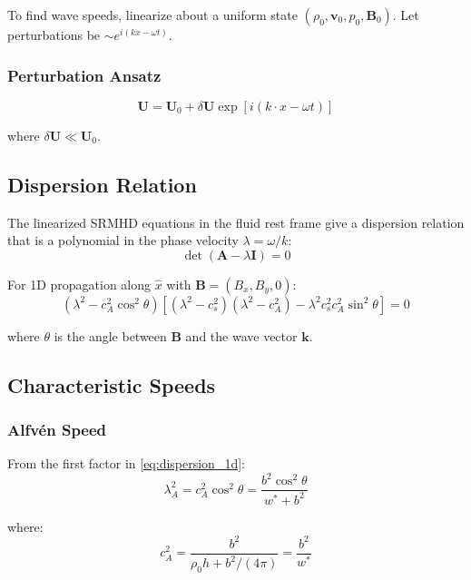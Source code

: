 \documentclass[12pt,a4paper]{article}
\begin{document}
To find wave speeds, linearize about a uniform state $(\rho_0, \bm{v}_0, p_0, \bm{B}_0)$.
Let perturbations be $\sim e^{i(kx - \omega t)}$.

\subsubsection{Perturbation Ansatz}

\begin{equation}
\bm{U} = \bm{U}_0 + \delta\bm{U} \exp[i(k \cdot x - \omega t)]
\label{eq:perturbation}
\end{equation}

where $\delta\bm{U} \ll \bm{U}_0$.

\subsection{Dispersion Relation}

The linearized SRMHD equations in the fluid rest frame give a dispersion relation
that is a polynomial in the phase velocity $\lambda = \omega/k$:
\begin{equation}
\det(\bm{A} - \lambda \bm{I}) = 0
\label{eq:dispersion_general}
\end{equation}

For 1D propagation along $\hat{x}$ with $\bm{B} = (B_x, B_y, 0)$:
\begin{equation}
(\lambda^2 - c_A^2 \cos^2\theta)[(\lambda^2 - c_s^2)(\lambda^2 - c_A^2)
- \lambda^2 c_s^2 c_A^2 \sin^2\theta] = 0
\label{eq:dispersion_1d}
\end{equation}

where $\theta$ is the angle between $\bm{B}$ and the wave vector $\bm{k}$.

\subsection{Characteristic Speeds}

\subsubsection{Alfv\'en Speed}

From the first factor in \eqref{eq:dispersion_1d}:
\begin{equation}
\lambda_A^2 = c_A^2 \cos^2\theta = \frac{b^2 \cos^2\theta}{w^* + b^2}
\label{eq:alfven_speed_derived}
\end{equation}

where:
\begin{equation}
c_A^2 = \frac{b^2}{\rho_0 h + b^2/(4\pi)} = \frac{b^2}{w^*}
\label{eq:alfven_speed_def}
\end{equation}
\end{document}
